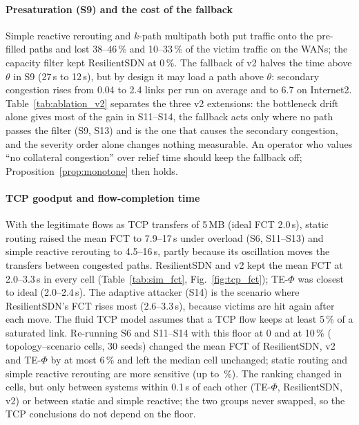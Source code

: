 \paragraph{Presaturation (S9) and the cost of the fallback}
Simple reactive rerouting and $k$-path multipath both put traffic onto the pre-filled paths and lost
38--46\,\% and 10--33\,\% of the victim traffic on the WANs; the capacity filter kept ResilientSDN
at 0\,\%. The fallback of v2 halves the time above $\theta$ in S9 (27\,s to 12\,s), but by design
it may load a path above $\theta$: secondary congestion rises from 0.04 to 2.4 links per run on
average and to 6.7 on Internet2.
Table~\ref{tab:ablation_v2} separates the three v2 extensions: the bottleneck drift alone gives
most of the gain in S11--S14, the fallback acts only where no path passes the filter (S9, S13)
and is the one that causes the secondary congestion, and the severity order alone changes
nothing measurable. An operator who values ``no collateral congestion'' over relief time should
keep the fallback off; Proposition~\ref{prop:monotone} then holds.



\paragraph{TCP goodput and flow-completion time}
With the legitimate flows as TCP transfers of 5\,MB (ideal FCT 2.0\,s), static routing raised the
mean FCT to 7.9--17\,s under overload (S6, S11--S13) and simple reactive rerouting to 4.5--16\,s,
partly because its oscillation moves the transfers between congested paths. ResilientSDN and v2
kept the mean FCT at 2.0--3.3\,s in every cell (Table~\ref{tab:sim_fct}, Fig.~\ref{fig:tcp_fct});
TE-$\Phi$ was closest to ideal (2.0--2.4\,s). The adaptive attacker (S14) is the scenario where
ResilientSDN's FCT rises most (2.6--3.3\,s), because victims are hit again after each move.
The fluid TCP model assumes that a TCP flow keeps at least 5\,\% of a saturated link. Re-running
S6 and S11--S14 with this floor at 0 and at 10\,\% (\floorCells{} topology--scenario cells, 30
seeds) changed the mean FCT of ResilientSDN, v2 and TE-$\Phi$ by at most 6\,\% and left the median
cell unchanged; static routing and simple reactive rerouting are more sensitive (up to
\floorMaxRel\,\%). The ranking changed in \floorFlips{} cells, but only between systems within
0.1\,s of each other (TE-$\Phi$, ResilientSDN, v2) or between static and simple reactive; the two
groups never swapped, so the TCP conclusions do not depend on the floor.


